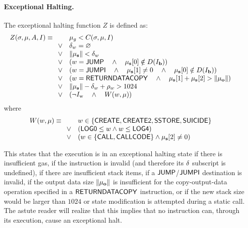 \paragraph{Exceptional Halting.}\hypertarget{Exceptional_Halting_function_Z}{}
%
The exceptional halting function $Z$ is defined as:
\begin{equation}
	Z(\mathbf{\sigma}, \mathbf{\mu}, A, I) \equiv
	\begin{array}[t]{ll}
		& \mathbf{\mu}_g < C(\mathbf{\sigma}, \mathbf{\mu}, I) \quad \\
		\vee & \mathbf{\delta}_w = \varnothing \quad \\
		\vee & \lVert\mathbf{\mu}_\mathbf{s}\rVert < \mathbf{\delta}_w \quad \\
		\vee & \left( w =  \mathsf{JUMP} \quad \wedge \quad \mathbf{\mu}_\mathbf{s}[0] \notin D(I_\mathbf{b})  \right) \quad \\
		\vee & \left( w =  \mathsf{JUMPI} \quad \wedge \quad \mathbf{\mu}_\mathbf{s}[1] \neq 0 \quad \wedge \quad \mathbf{\mu}_\mathbf{s}[0] \notin D(I_\mathbf{b})  \right) \quad \\
		\vee & \left( w = \mathsf{RETURNDATACOPY} \quad \wedge \quad \mathbf{\mu}_{\mathbf{s}}[1] + \mathbf{\mu}_{\mathbf{s}}[2] > \lVert\mathbf{\mu}_{\mathbf{o}}\rVert \right) \quad \\
		\vee & \lVert\mathbf{\mu}_\mathbf{s}\rVert - \mathbf{\delta}_w + \mathbf{\rho}_w > 1024 \quad\\ 
		\vee & \left(\neg I_{\mathrm{w}} \quad \wedge \quad W(w, \mathbf{\mu})\right)\quad 
	\end{array}
\end{equation}
where
\begin{equation}
W(w, \mathbf{\mu}) \equiv \\
\begin{array}[t]{ll}
	& w \in \{ \mathsf{CREATE},  \mathsf{CREATE2},  \mathsf{SSTORE}, \mathsf{SUICIDE}\} \quad \\
	\vee & \left(\mathsf{LOG0} \le w \wedge w \le  \mathsf{LOG4} \right)\\
	\vee & \left(w \in \{ \mathsf{CALL},  \mathsf{CALLCODE}\} \wedge \mathbf{\mu}_{\mathbf{s}}[2] \neq 0\right)
\end{array}
\end{equation}

This states that the execution is in an exceptional halting state if there is insufficient gas, if the instruction is invalid (and therefore its $\mathbf{\delta}$ subscript is undefined), if there are insufficient stack items, if a $\mathsf{JUMP}$/$\mathsf{JUMPI}$ destination is invalid, 
if the output data size $\lVert\mathbf{\mu}_{\mathbf{o}}\rVert$ is insufficient for the copy-output-data operation specified in a $\mathsf{RETURNDATACOPY}$ instruction,
or if the new stack size would be larger than $1024$ or state modification is attempted during a static call. The astute reader will realize that this implies that no instruction can, through its execution, cause an exceptional halt.

